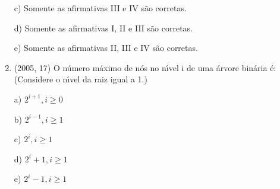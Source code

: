 \documentclass{article}
\begin{document}
\begin{enumerate}
c) Somente as afirmativas III e IV são corretas.

d) Somente as afirmativas I, II e III são corretas.

e) Somente as afirmativas II, III e IV são corretas.\newline




\item(2005, 17) O número máximo de nós no nı́vel i de uma árvore binária é:
(Considere o nı́vel da raiz igual a 1.)

a) $2^{i+1}, i \geq 0$

b) $2^{i-1}, i \geq 1$

c) $2^{i}, i \geq 1$

d) $2^{i}+1, i \geq 1$

e) $2^{i}-1, i \geq 1$ \newline

\newpage

\end{enumerate}
\end{document}
